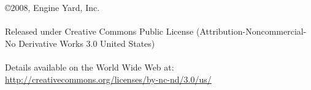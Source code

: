 \documentclass{book}
\begin{document}
\pagestyle{empty}

\cleardoublepage

\copyright 2008, Engine Yard, Inc.\\
\\
Released under Creative Commons Public License (Attribution-Noncommercial-No Derivative Works 3.0 United States)\\
\\
Details available on the World Wide Web at:\\
\url{http://creativecommons.org/licenses/by-nc-nd/3.0/us/}
\cleardoublepage

\pagestyle{headings}



\end{document}
